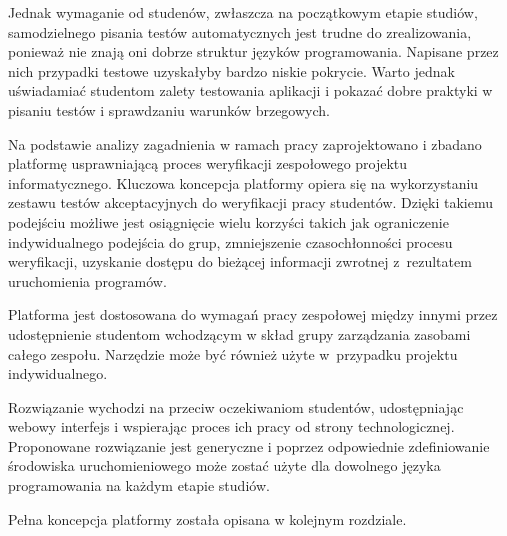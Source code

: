 Jednak wymaganie od studenów, zwłaszcza na początkowym etapie studiów, samodzielnego pisania testów automatycznych jest trudne do zrealizowania, ponieważ nie znają oni dobrze struktur języków programowania.
Napisane przez nich przypadki testowe uzyskałyby bardzo niskie pokrycie.
Warto jednak uświadamiać studentom zalety testowania aplikacji i pokazać dobre praktyki w pisaniu testów i sprawdzaniu warunków brzegowych.

Na podstawie analizy zagadnienia w ramach pracy zaprojektowano i zbadano platformę usprawniającą proces weryfikacji zespołowego projektu informatycznego.
Kluczowa koncepcja platformy opiera się na wykorzystaniu zestawu testów akceptacyjnych do weryfikacji pracy studentów.
Dzięki takiemu podejściu możliwe jest osiągnięcie wielu korzyści takich jak ograniczenie indywidualnego podejścia do grup, zmniejszenie czasochłonności procesu weryfikacji, uzyskanie dostępu do bieżącej informacji zwrotnej z~rezultatem uruchomienia programów.

Platforma jest dostosowana do wymagań pracy zespołowej między innymi przez udostępnienie studentom wchodzącym w skład grupy zarządzania zasobami całego zespołu.
Narzędzie może być również użyte w~przypadku projektu indywidualnego.

Rozwiązanie wychodzi na przeciw oczekiwaniom studentów, udostępniając webowy interfejs i wspierając proces ich pracy od strony technologicznej.
Proponowane rozwiązanie jest generyczne i poprzez odpowiednie zdefiniowanie środowiska uruchomieniowego może zostać użyte dla dowolnego języka programowania na każdym etapie studiów.

Pełna koncepcja platformy została opisana w kolejnym rozdziale.





